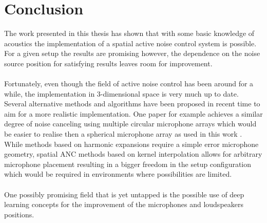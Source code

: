 \chapter{Conclusion}
The work presented in this thesis has shown that with some basic knowledge of acoustics the implementation of a spatial active noise control system is possible. For a given setup the results are promising however, the dependence on the noise source position for satisfying results leaves room for improvement.\\\\ Fortunately, even though the field of active noise control has been around for a while, the implementation in 3-dimensional space is very much up to date. Several alternative methods and algorithms have been proposed in recent time to aim for a more realistic implementation. One paper for example achieves a similar degree of noise canceling using multiple circular microphone arrays which would be easier to realise then a spherical microphone array as used in this work \cite{Maeno2018}.\\ While methods based on harmonic expansions require a simple error microphone geometry, spatial ANC methods based on kernel interpolation allows for arbitrary microphone placement \cite{Koyama2021} resulting in a bigger freedom in the setup configuration which would be required in environments where possibilities are limited.\\\\ One possibly promising field that is yet untapped is the possible use of deep learning concepts for the improvement of the microphones and loudspeakers positions.